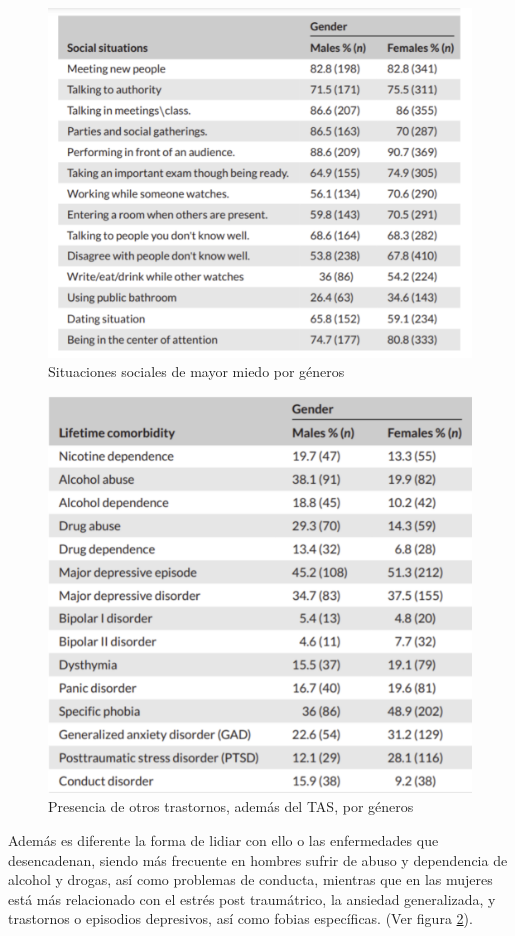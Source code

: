 \documentclass[12pt, a4paper,twoside,titlepage]{book}
\begin{document}
\begin{itemize}
{\begin{figure}
    \centering
    \includegraphics[width=.9\linewidth]{TGF/Extra/TAS.png}
    \caption{Situaciones sociales de mayor miedo por géneros}
    \label{fig:TAS}
\end{figure}

\begin{figure}
	\centering
	\includegraphics[width=.9\linewidth]{TGF/Extra/TAS2.png}
	\caption{Presencia de otros trastornos, además del TAS, por géneros}
	\label{fig:TAS2}
\end{figure}


Además es diferente la forma de lidiar con ello o las enfermedades que desencadenan, siendo más frecuente en hombres sufrir de abuso y dependencia de alcohol y drogas, así como problemas de conducta, mientras que en las mujeres está más relacionado con el estrés post traumátrico, la ansiedad generalizada, y trastornos o episodios depresivos, así como fobias específicas. (Ver figura \ref{fig:TAS2}).

}
\end{itemize}
\end{document}
